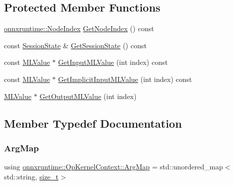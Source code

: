 \subsection*{Protected Member Functions}
\begin{DoxyCompactItemize}
\item 
\mbox{\hyperlink{namespaceonnxruntime_af8773b5c12b5d8fd9292eb2e268df760}{onnxruntime\+::\+Node\+Index}} \mbox{\hyperlink{classonnxruntime_1_1OpKernelContext_a58ebfd9ec8b6062ea79bb2fdb98fd2da}{Get\+Node\+Index}} () const
\item 
const \mbox{\hyperlink{classonnxruntime_1_1SessionState}{Session\+State}} \& \mbox{\hyperlink{classonnxruntime_1_1OpKernelContext_aa39b5ccbcbed000ba572de3398f38738}{Get\+Session\+State}} () const
\item 
const \mbox{\hyperlink{classonnxruntime_1_1MLValue}{M\+L\+Value}} $\ast$ \mbox{\hyperlink{classonnxruntime_1_1OpKernelContext_a1af1631383c5599a72357667c899d790}{Get\+Input\+M\+L\+Value}} (int index) const
\item 
const \mbox{\hyperlink{classonnxruntime_1_1MLValue}{M\+L\+Value}} $\ast$ \mbox{\hyperlink{classonnxruntime_1_1OpKernelContext_a690b78acd5f2e55b7ef39e7d014f796c}{Get\+Implicit\+Input\+M\+L\+Value}} (int index) const
\item 
\mbox{\hyperlink{classonnxruntime_1_1MLValue}{M\+L\+Value}} $\ast$ \mbox{\hyperlink{classonnxruntime_1_1OpKernelContext_a762e7a53c262fbade08d571bfbb5ce7d}{Get\+Output\+M\+L\+Value}} (int index)
\end{DoxyCompactItemize}


\subsection{Member Typedef Documentation}
\mbox{\label{classonnxruntime_1_1OpKernelContext_ae0b5ac00d35dcfd43bbc28f655f92fe1}} 
\subsubsection{\texorpdfstring{Arg\+Map}{ArgMap}}
{\footnotesize\ttfamily using \mbox{\hyperlink{classonnxruntime_1_1OpKernelContext_ae0b5ac00d35dcfd43bbc28f655f92fe1}{onnxruntime\+::\+Op\+Kernel\+Context\+::\+Arg\+Map}} =  std\+::unordered\+\_\+map$<$std\+::string, \mbox{\hyperlink{mlasi_8h_a503efbc1c6e50825320ad909366b78ab}{size\+\_\+t}}$>$}



